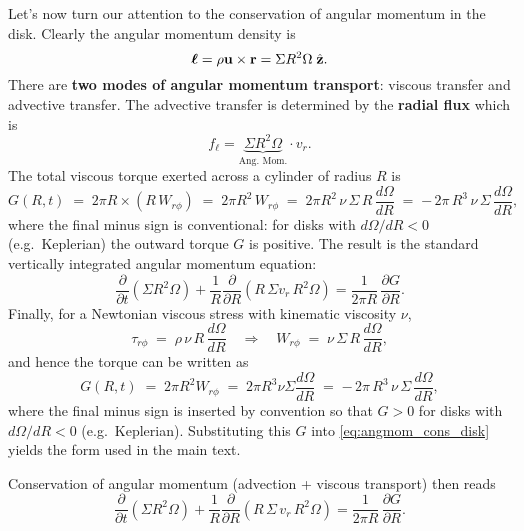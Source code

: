 Let's now turn our attention to the conservation of angular momentum in the disk. Clearly the angular momentum density is
\[
\boldsymbol{\ell} = \rho {\bf u} \times {\bf r} = \Sigma R^2 \Omega \;\hat{\bf z}.
\]
There are \textbf{two modes of angular momentum transport}: viscous transfer and advective transfer. The advective transfer is determined by the \textbf{radial flux} which is
\[
f_\ell = \underbrace{\Sigma R^2 \Omega}_{\text{Ang. Mom.}} \cdot v_r. 
\]
The total viscous torque exerted across a cylinder of radius $R$ is 
\begin{equation}
G(R,t) \;=\; 2\pi R \times (R\,W_{r\phi})
\;=\; 2\pi R^2\,W_{r\phi}
\;=\; 2\pi R^2\,\nu\,\Sigma\,R\,\frac{d\Omega}{dR}
\;=\; \boxed{-\,2\pi\,R^3\,\nu\,\Sigma\,\frac{d\Omega}{dR}},
\label{eq:G_def}
\end{equation}
where the final minus sign is conventional: for disks with $d\Omega/dR<0$ (e.g.\ Keplerian) the outward torque $G$ is positive. The result is the standard vertically integrated angular momentum equation:
\begin{equation}
\boxed{\;
\frac{\partial}{\partial t}\!\left(\Sigma R^2\Omega\right)
+ \frac{1}{R}\frac{\partial}{\partial R}\!\left(R\,\Sigma v_r\,R^2\Omega\right)
= \frac{1}{2\pi R}\,\frac{\partial G}{\partial R}.
\;}
\label{eq:angmom_cons_disk}
\end{equation}
Finally, for a Newtonian viscous stress with kinematic viscosity $\nu$,
\begin{equation}
\tau_{r\phi} \;=\; \rho\,\nu\,R\,\frac{d\Omega}{dR}
\quad\Longrightarrow\quad
W_{r\phi} \;=\; \nu\,\Sigma\,R\,\frac{d\Omega}{dR},
\end{equation}
and hence the torque can be written as
\begin{equation}
G(R,t) \;=\; 2\pi R^2 W_{r\phi}
\;=\; 2\pi R^3 \nu \Sigma \frac{d\Omega}{dR}
\;=\; \boxed{-\,2\pi\,R^3\,\nu\,\Sigma\,\frac{d\Omega}{dR}},
\end{equation}
where the final minus sign is inserted by convention so that $G>0$ for disks with $d\Omega/dR<0$ (e.g.\ Keplerian). Substituting this $G$ into \eqref{eq:angmom_cons_disk} yields the form used in the main text.


Conservation of angular momentum (advection + viscous transport) then reads
\begin{equation}
\boxed{\;
\frac{\partial}{\partial t}\!\left(\Sigma R^2\Omega\right)
+ \frac{1}{R}\frac{\partial}{\partial R}\!\left(R\,\Sigma\,v_r\,R^2\Omega\right)
= \frac{1}{2\pi R}\,\frac{\partial G}{\partial R}.
\;}
\label{eq:angmom_cons_disk}
\end{equation}

